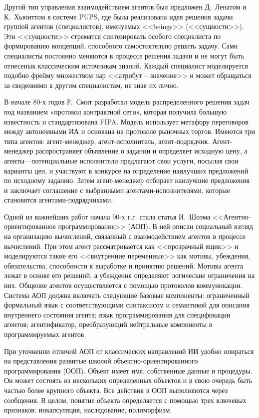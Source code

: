 Другой тип управления взаимодействием агентов был предложен Д.~Ленатом и К.~Хьюиттом в системе PUPS, где была реализована идея решения задачи группой агентов (специалистов), именуемых <<beings>> (<<сущности>>). Эти <<сущности>> стремятся синтезировать особого специалиста по формированию концепций, способного самостоятельно решить задачу. Сами специалисты постоянно меняются в процессе решения задачи и не могут быть отнесенык классическим источникам знаний. Каждый специалист моделируется подобно фрейму множеством пар <<атрибут -- значение>> и может обращаться за сведениями к другим специалистам, не зная их лично.

В начале 80-х годов Р.~Смит разработал модель распределенного решения задач под названием «протокол контрактной сети», которая получила большую известность и стандартизована FIPA. Модель использует метафору переговоров между автономными ИА и основана на протоколе рыночных торгов. Имеются три типа агентов: агент-менеджер, агент-исполнитель, агент-подрядчик. Агент-менеджер распространяет объявление о задании и определяет исходную цену, а агенты—потенциальные исполнители предлагают свои услуги, посылая свои варианты цен, и участвуют в конкурсе на определение наилучших предложений по исходному заданию. Затем агент-менеджер отбирает наилучшие предложения и заключает соглашение с выбранными агентами-исполнителями, которые становятся агентами-подрядчиками.

Одной из важнейших работ начала 90-х г.г. стала статья И.~Шоэма <<Агентно-ориентированное программирование>> (АОП). В ней описан социальный взгляд на организацию вычислений, связанный с взаимодействием агентов в процессе вычислений. При этом агент рассматривается как <<прозрачный ящик>> и моделируются такие его <<внутренние переменные>> как мотивы, убеждения, обязательства, способности к выработке и принятию решений. Мотивы агента лежат в основе его решений, а убеждения определяют логические ограничения на них. Общение агентов осуществляется с помощью протоколов коммуникации.
Система АОП должна включать следующие базовые компоненты: ограниченный формальный язык с соответствующими синтаксисом и семантикой для описания внутреннего состояния агента; язык программирования для спецификации агентов; агентификатор, преобразующий нейтральные компоненты в программируемых агентов.

При уточнении отличий АОП от классических направлений ИИ удобно опираться на представления развитые школой объектно-ориентированного программирования (ООП). Объект имеет имя, собственные данные и процедуры. Он может состоять из нескольких определенных объектов и в свою очередь быть частью более крупного объекта. Все действия в ООП выполняются через сообщения. В целом, понятие объекта определяется с помощью трех ключевых признаков: инкапсуляция, наследование, полиморфизм.

